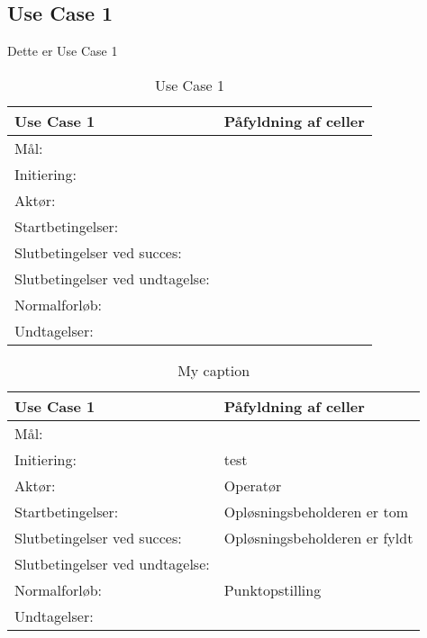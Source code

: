 \subsection{Use Case 1}
Dette er Use Case 1


\begin{table}[]
\centering
\label{my-label}
\begin{tabular}{|l|l|}
\hline
\textbf{Use Case 1  }           & \textbf{Påfyldning af celler} \\ \hline
Mål:                            &         \\ \hline
Initiering:                     &                            \\ \hline
Aktør:                          &                            \\ \hline
Startbetingelser:               &                            \\ \hline
Slutbetingelser ved succes:     &                            \\ \hline
Slutbetingelser ved undtagelse: &                            \\ \hline
Normalforløb:                   &                            \\ \hline
Undtagelser:                    &                            \\ \hline
\end{tabular}
\caption{Use Case 1}
\label{tab:uc1}
\end{table}

\begin{table}[]
\centering

\begin{tabular}{|l|l|}
\hline
\textbf{Use Case 1  }           & \textbf{Påfyldning af celler }\\ \hline
Mål:                            &               \\ \hline
Initiering:                     & test	\\ \hline
Aktør:                          &   Operatør                       \\ \hline
Startbetingelser:               &    Opløsningsbeholderen er tom        \\ \hline
Slutbetingelser ved succes:     &     Opløsningsbeholderen er fyldt      \\ \hline
Slutbetingelser ved undtagelse: &                            \\ \hline
Normalforløb:                   & Punktopstilling
\\ \hline
Undtagelser:                    &                            \\ \hline
\end{tabular}

\caption{My caption}
\label{my-label}
\end{table}

